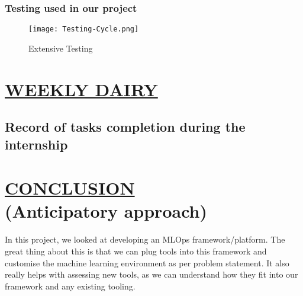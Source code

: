 \documentclass[12pt,oneside,a4paper]{report}
\begin{document}
\subsection{Testing used in our project}

\begin{figure}[h]
\centering
\texttt{[image: Testing-Cycle.png]}
\caption{Extensive Testing }
\label{fig_TestingCycle}
\end{figure}


\chapter{\underline{WEEKLY DAIRY}}\vspace{-15.0mm}
\section{Record of tasks completion during the internship}
\begin{table}[ht]
\centering
{}
\end{table}

\chapter{\underline{CONCLUSION}\\\large{(Anticipatory approach)}}
In this project, we looked at developing an MLOps framework/platform. The great thing about this is that we can plug tools into this framework and customise the machine learning environment as per problem statement. It also really helps with assessing new tools, as we can understand how they fit into our framework and any existing tooling. \vspace{5.0mm}
\end{document}
